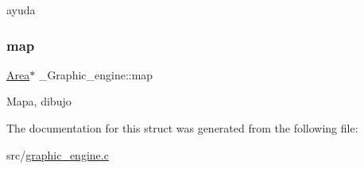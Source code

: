 ayuda \mbox{\label{struct__Graphic__engine_a1ea06bb881d335da8c31d63b3e834bdb}} 
\subsubsection{\texorpdfstring{map}{map}}
{\footnotesize\ttfamily \hyperlink{struct__Area}{Area}$\ast$ \+\_\+\+Graphic\+\_\+engine\+::map}

Mapa, dibujo 

The documentation for this struct was generated from the following file\+:\begin{DoxyCompactItemize}
\item 
src/\hyperlink{graphic__engine_8c}{graphic\+\_\+engine.\+c}\end{DoxyCompactItemize}
